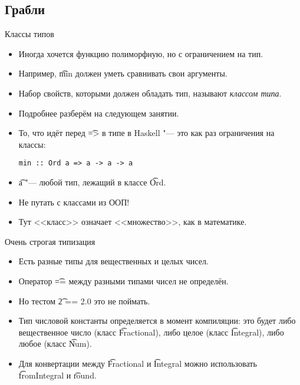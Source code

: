 \subsection{Грабли}

\begin{frame}
\end{frame}

\begin{frame}[fragile]{Классы типов}
	\begin{itemize}
		\item Иногда хочется функцию полиморфную, но с ограничением на тип.
		\item Например, \t{min} должен уметь сравнивать свои аргументы.
		\item Набор свойств, которыми должен обладать тип, называют \textit{классом типа}.
		\item Подробнее разберём на следующем занятии.
		\item То, что идёт перед \t{=>} в типе в Haskell "--- это как раз ограничения на классы:
\begin{verbatim}
min :: Ord a => a -> a -> a
\end{verbatim}
		\item \t{a} "--- любой тип, лежащий в классе \t{Ord}.
		\item Не путать с классами из ООП!
		\item Тут <<класс>> означает <<множество>>, как в математике.
	\end{itemize}
\end{frame}

\begin{frame}{Очень строгая типизация}
	\begin{itemize}
		\item Есть разные типы для вещественных и целых чисел.
		\item Оператор \t{==} между разными типами чисел не определён.
		\item Но тестом \t{2 == 2.0} это не поймать.
		\item Тип числовой константы определяется в момент компиляции: это будет либо вещественное число (класс \t{Fractional}), либо целое (класс \t{Integral}), либо любое (класс \t{Num}).
		\item Для конвертации между \t{Fractional} и \t{Integral} можно использовать \t{fromIntegral} и \t{round}.
	\end{itemize}
\end{frame}

